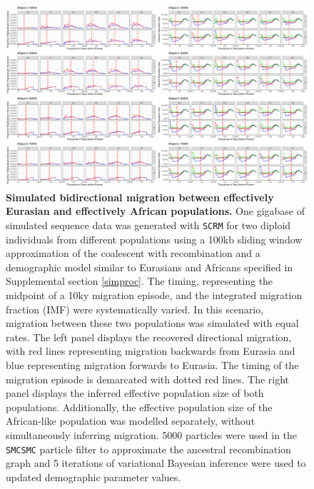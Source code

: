 \documentclass{article}
\begin{document}
\clearpage
\begin{figure}
	\centering
	\includegraphics[width=\textwidth]{plot/bidirectional_different_starts.pdf}
	\caption{{\bf Simulated bidirectional migration between effectively Eurasian and effectively African populations.} One gigabase of simulated sequence data was generated with {\tt SCRM} for two diploid individuals from different populations using a 100kb sliding window approximation of the coalescent with recombination and a demographic model similar to Eurasians and Africans specified in Supplemental section \ref{simproc}. The timing, representing the midpoint of a 10ky migration episode, and the integrated migration fraction (IMF) were systematically varied. In this scenario, migration between these two populations was simulated with equal rates. The left panel displays the recovered directional migration, with red lines representing migration backwards from Eurasia and blue representing migration forwards to Eurasia. The timing of the migration episode is demarcated with dotted red lines. The right panel displays the inferred effective population size of both populations. Additionally, the effective population size of the African-like population was modelled separately, without simultaneously inferring migration. 5000 particles were used in the {\tt SMCSMC} particle filter to approximate the ancestral recombination graph and 5 iterations of variational Bayesian inference were used to updated demographic parameter values.}
	\label{fig:bisim}
\end{figure}
\end{document}
